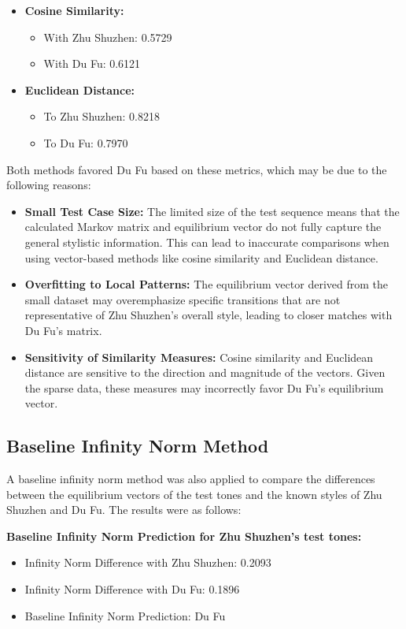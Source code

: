 \documentclass[12pt]{article}
\begin{document}
\begin{itemize}
    \item \textbf{Cosine Similarity:}
    \begin{itemize}
        \item With Zhu Shuzhen: 0.5729
        \item With Du Fu: 0.6121
    \end{itemize}
    \item \textbf{Euclidean Distance:}
    \begin{itemize}
        \item To Zhu Shuzhen: 0.8218
        \item To Du Fu: 0.7970
    \end{itemize}
\end{itemize}

\noindent Both methods favored Du Fu based on these metrics, which may be due to the following reasons:
\begin{itemize}
    \item \textbf{Small Test Case Size:} The limited size of the test sequence means that the calculated Markov matrix and equilibrium vector do not fully capture the general stylistic information. This can lead to inaccurate comparisons when using vector-based methods like cosine similarity and Euclidean distance.
    \item \textbf{Overfitting to Local Patterns:} The equilibrium vector derived from the small dataset may overemphasize specific transitions that are not representative of Zhu Shuzhen’s overall style, leading to closer matches with Du Fu's matrix.
    \item \textbf{Sensitivity of Similarity Measures:} Cosine similarity and Euclidean distance are sensitive to the direction and magnitude of the vectors. Given the sparse data, these measures may incorrectly favor Du Fu's equilibrium vector.
\end{itemize}

\subsection*{Baseline Infinity Norm Method}

A baseline infinity norm method was also applied to compare the differences between the equilibrium vectors of the test tones and the known styles of Zhu Shuzhen and Du Fu. The results were as follows:

\textbf{Baseline Infinity Norm Prediction for Zhu Shuzhen's test tones:}
\begin{itemize}
    \item Infinity Norm Difference with Zhu Shuzhen: 0.2093
    \item Infinity Norm Difference with Du Fu: 0.1896
    \item Baseline Infinity Norm Prediction: Du Fu
\end{itemize}
\end{document}
